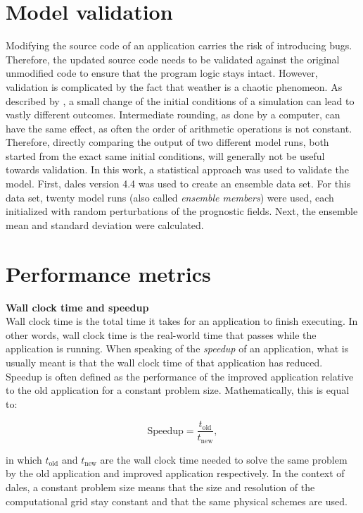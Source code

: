 \section{Model validation}
Modifying the source code of an application carries the risk of introducing bugs. Therefore, the updated source code needs to be validated against the original unmodified code to ensure that the program logic stays intact. However, validation is complicated by the fact that weather is a chaotic phenomeon. As described by \citet{lorenzDeterministicNonperiodicFlow1963}, a small change of the initial conditions of a simulation can lead to vastly different outcomes. Intermediate rounding, as done by a computer, can have the same effect, as often the order of arithmetic operations is not constant. Therefore, directly comparing the output of two different model runs, both started from the exact same initial conditions, will generally not be useful towards validation. In this work, a statistical approach was used to validate the model. First, \acrshort{dales} version 4.4 was used to create an ensemble data set. For this data set, twenty model runs (also called \emph{ensemble members}) were used, each initialized with random perturbations of the prognostic fields. Next, the ensemble mean and standard deviation were calculated. 

\section{Performance metrics}

\noindent \textbf{Wall clock time and speedup} \\
Wall clock time is the total time it takes for an application to finish executing. In other words, wall clock time is the real-world time that passes while the application is running. When speaking of the \emph{speedup} of an application, what is usually meant is that the wall clock time of that application has reduced. Speedup is often defined as the performance of the improved application relative to the old application for a constant problem size. Mathematically, this is equal to:

\begin{equation}
    \text{Speedup} = \frac{t_{\text{old}}}{t_{\text{new}}},
\end{equation}

in which $t_{\text{old}}$ and $t_{\text{new}}$ are the wall clock time needed to solve the same problem by the old application and improved application respectively. In the context of \acrshort{dales}, a constant problem size means that the size and resolution of the computational grid stay constant and that the same physical schemes are used.

